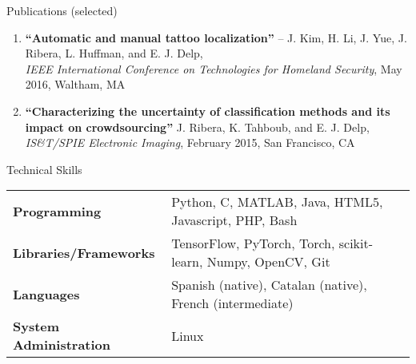 \documentclass{resume} %
\begin{document}
\begin{rSection}{Publications (selected)}
\begin{enumerate}
\item 
\textbf{``Automatic and manual tattoo localization''} -- J. Kim, H. Li, J. Yue, J. Ribera, L. Huffman, and E. J. Delp, \\
		\emph{IEEE International Conference on Technologies for Homeland Security}, May 2016, Waltham, MA %
\item 
\textbf{``Characterizing the uncertainty of classification methods and its impact on crowdsourcing''} J. Ribera, K. Tahboub, and E. J. Delp, \\
        \emph{IS\&T/SPIE Electronic Imaging}, February 2015, San Francisco, CA %
\end{enumerate}

\vspace{-1pt}

\end{rSection}


\begin{rSection}{Technical Skills}

\begin{tabular}{ @{} >{\bfseries}l @{\hspace{3ex}} l }
\textbf{Programming} & Python, C, MATLAB, Java, HTML5, Javascript, PHP, Bash \\
\textbf{Libraries/Frameworks} & TensorFlow, PyTorch, Torch, scikit-learn, Numpy, OpenCV, Git \\
\textbf{Languages} & Spanish (native), Catalan (native), French (intermediate) \\
\textbf{System Administration} & Linux
\end{tabular}

\vspace{-1pt}

\end{rSection}
\end{document}
